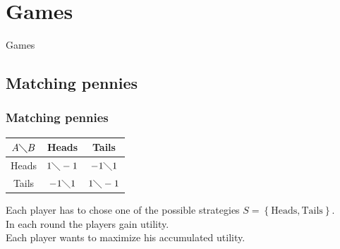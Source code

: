 \documentclass{beamer}
\begin{document}
\section{Games}
\begin{frame}[c]
	\begin{center}
		\Huge Games
	\end{center}
\end{frame}

\subsection{Matching pennies}
\begin{frame}[c]
		\frametitle{Matching pennies}
	\begin{center}
		
		
		\begin{tabular}{c||c|c}
			$A\diagdown B$ & Heads & Tails \\ \hline \hline
			Heads & $1\diagdown -1$ & $-1\diagdown 1$ \\ \hline
			Tails & $-1\diagdown 1$ & $1\diagdown -1$
		\end{tabular} 
	\end{center}
		\pause
		
		\vspace{1em}
		Each player has to chose one of the possible strategies $S = \left\lbrace \text{Heads}, \text{Tails} \right\rbrace$. \\ \pause
		In each round the players  gain utility.\\ \pause
		\vspace{1em}
		Each player wants to maximize his accumulated utility.
\end{frame}
\end{document}
